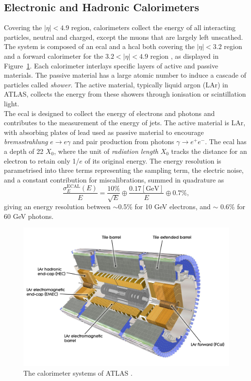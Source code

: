 \subsection{Electronic and Hadronic Calorimeters}
Covering the $|\eta| < 4.9$ region, calorimeters collect the energy of all interacting particles, neutral and charged, except the muons that are largely left unscathed. The system is composed of an \gls{ecal} and a \gls{hcal} both covering the $|\eta| < 3.2$ region and a forward calorimeter for the $3.2 < |\eta| < 4.9$ region \cite{TheATLASCollaboration_2008}, as displayed in Figure~\ref{fig-AtlasDecCalo}. Each calorimeter interlays specific layers of active and passive materials. The passive material has a large atomic number to induce a cascade of particles called \textit{shower}. The active material, typically liquid argon (LAr) in ATLAS, collects the energy from these showers through ionisation or scintillation light.\\

The \gls{ecal} is designed to collect the energy of electrons and photons and contributes to the measurement of the energy of jets. The active material is LAr, with absorbing plates of lead used as passive material to encourage \textit{bremsstrahlung} $e \rightarrow e\gamma$ and pair production from photons $\gamma \rightarrow e^+e^-$. The \gls{ecal} has a depth of 22 $X_0$, where the unit of \textit{radiation length} $X_0$ tracks the distance for an electron to retain only 1/$e$ of its original energy. The energy resolution is parametrised into three terms representing the sampling term, the electric noise, and a constant contribution for miscalibrations, summed in quadrature as \cite{Cavallari_2011}
\begin{equation}
  \frac{\sigma_E^{\text{ECAL}}(E)}{E} = \frac{10\%}{\sqrt{E}} \oplus \frac{0.17 [\text{GeV}]}{E} \oplus 0.7\%,
\end{equation}
giving an energy resolution between $\sim$0.5\% for 10 GeV electrons, and $\sim$ 0.6\% for 60 GeV photons.\\

\begin{figure}[!h]
  \centering
  \includegraphics[width=\textwidth]{Images/ATLAS/ATLASCalo.jpg}
  \caption{The calorimeter systems of ATLAS \cite{ATLASschematics}.}
  \label{fig-AtlasDecCalo}
\end{figure}

